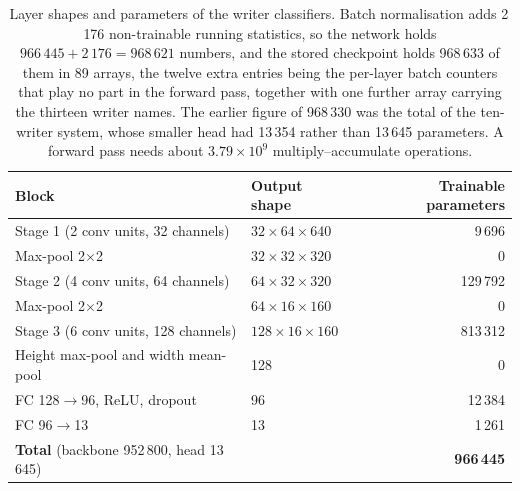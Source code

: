\begin{table}[h]
\centering
\fontsize{9.5}{11.5}\selectfont
\begin{tabular}{|l|l|r|}
\hline
\textbf{Block} & \textbf{Output shape} & \textbf{Trainable parameters} \\
\hline
Stage 1 (2 conv units, 32 channels) & $32\times64\times640$ & 9\,696 \\
Max-pool 2$\times$2 & $32\times32\times320$ & 0 \\
Stage 2 (4 conv units, 64 channels) & $64\times32\times320$ & 129\,792 \\
Max-pool 2$\times$2 & $64\times16\times160$ & 0 \\
Stage 3 (6 conv units, 128 channels) & $128\times16\times160$ & 813\,312 \\
Height max-pool and width mean-pool & 128 & 0 \\
FC 128$\to$96, ReLU, dropout & 96 & 12\,384 \\
FC 96$\to$13 & 13 & 1\,261 \\
\hline
\textbf{Total} (backbone 952\,800, head 13\,645) & & \textbf{966\,445} \\
\hline
\end{tabular}
\caption{Layer shapes and parameters of the writer classifiers. Batch normalisation adds 2\,176 non-trainable running statistics, so the network holds $966\,445+2\,176=968\,621$ numbers, and the stored checkpoint holds 968\,633 of them in 89 arrays, the twelve extra entries being the per-layer batch counters that play no part in the forward pass, together with one further array carrying the thirteen writer names. The earlier figure of 968\,330 was the total of the ten-writer system, whose smaller head had 13\,354 rather than 13\,645 parameters. A forward pass needs about $3.79\times10^9$ multiply--accumulate operations.}
\label{tab:wid-layers}
\end{table}

